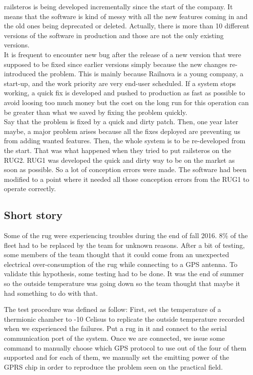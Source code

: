 \documentclass[12pt]{article}
\theoremstyle{definition}
\theoremstyle{definition}
\begin{document}
\gls{railsteros} is being developed incrementally since the start of the company. It means that the software is kind of messy with all the new features coming in and the old ones being deprecated or deleted. Actually, there is more than 10 different versions of the software in production and those are not the only existing versions.\\

It is frequent to encounter new bug after the release of a new version that were supposed to be fixed since earlier versions simply because the new changes re-introduced the problem. This is mainly because Railnova is a young company, a start-up, and the work priority are very end-user scheduled. If a system stops working, a quick fix is developed and pushed to production as fast as possible to avoid loosing too much money but the cost on the long run for this operation can be greater than what we saved by fixing the problem quickly.\\

Say that the problem is fixed by a quick and dirty patch. Then, one year later maybe, a major problem arises because all the fixes deployed are preventing us from adding wanted features. Then, the whole system is to be re-developed from the start. That was what happened when they tried to put \gls{railsteros} on the RUG2. RUG1 was developed the quick and dirty way to be on the market as soon as possible. So a lot of conception errors were made. The software had been modified to a point where it needed all those conception errors from the RUG1 to operate correctly.\\

\subsection{Short story}

Some of the \gls{rug} were experiencing troubles during the end of fall 2016. 8\% of the fleet had to be replaced by the team for unknown reasons. After a bit of testing, some members of the team thought that it could come from an unexpected electrical over-consumption of the \gls{rug} while connecting to a GPS antenna. To validate this hypothesis, some testing had to be done. It was the end of summer so the outside temperature was going down so the team thought that maybe it had something to do with that.

The test procedure was defined as follow: First, set the temperature of a thermionic chamber to -10 Celisus to replicate the outside temperature recorded when we experienced the failures. Put a \gls{rug} in it and connect to the serial communication port of the system. Once we are connected, we issue some command to manually choose which GPS protocol to use out of the four of them supported and for each of them, we manually set the emitting power of the GPRS chip in order to reproduce the problem seen on the practical field.\\
\end{document}
